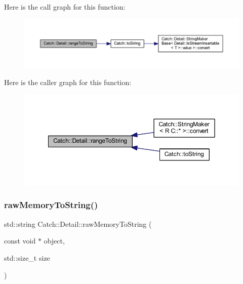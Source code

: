 Here is the call graph for this function\+:\nopagebreak
\begin{figure}[H]
\begin{center}
\leavevmode
\includegraphics[width=350pt]{namespace_catch_1_1_detail_a6650a1dff325bf29962ff15ae73fd972_cgraph}
\end{center}
\end{figure}
Here is the caller graph for this function\+:\nopagebreak
\begin{figure}[H]
\begin{center}
\leavevmode
\includegraphics[width=350pt]{namespace_catch_1_1_detail_a6650a1dff325bf29962ff15ae73fd972_icgraph}
\end{center}
\end{figure}
\hypertarget{namespace_catch_1_1_detail_ac5d6c510e565ee5bddcc2236194ce29e}{}\label{namespace_catch_1_1_detail_ac5d6c510e565ee5bddcc2236194ce29e} 
\subsubsection{\texorpdfstring{raw\+Memory\+To\+String()}{rawMemoryToString()}\hspace{0.1cm}{\footnotesize\ttfamily [1/2]}}
{\footnotesize\ttfamily std\+::string Catch\+::\+Detail\+::raw\+Memory\+To\+String (\begin{DoxyParamCaption}\item[{const void $\ast$}]{object,  }\item[{std\+::size\+\_\+t}]{size }\end{DoxyParamCaption})}

